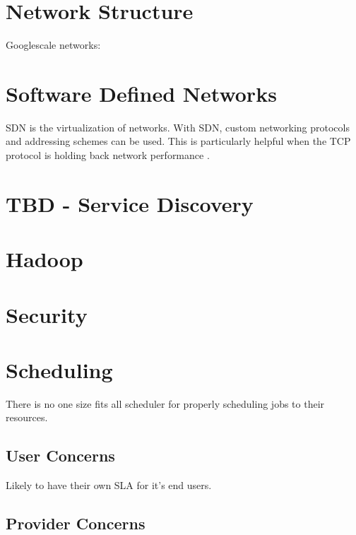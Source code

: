 \documentclass[fullapage,12pt]{article}
\begin{document}



\section{Network Structure}

Googlescale networks: \cite{singh2015jupiter} %

\section{Software Defined Networks}

SDN is the virtualization of networks. With SDN, custom networking protocols and addressing schemes can be used. This is particularly helpful when the TCP protocol is holding back network performance \cite{Jennings2015}.

\section{TBD - Service Discovery}

\section{Hadoop}

\section{Security}

\section{Scheduling}

There is no one size fits all scheduler for properly scheduling jobs to their resources. \cite{Jennings2015}



\subsection{User Concerns}

\cite{Jennings2015}
Likely to have their own SLA for it's end users.


\subsection{Provider Concerns} \label{provider-concerns}
\end{document}

